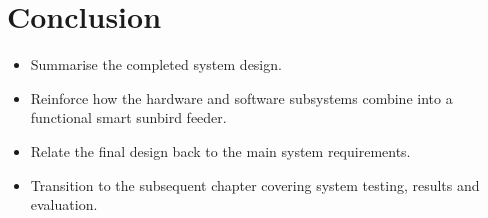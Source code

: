 \section{Conclusion}
\label{sec:DesignConclusion}

\begin{itemize}
    \item Summarise the completed system design.
    \item Reinforce how the hardware and software subsystems combine into a functional smart sunbird feeder.
    \item Relate the final design back to the main system requirements.
    \item Transition to the subsequent chapter covering system testing, results and evaluation.
\end{itemize}